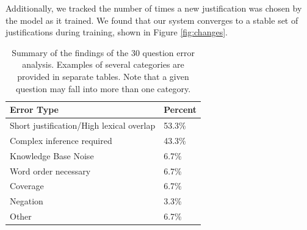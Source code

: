 Additionally, we tracked the number of times a new justification was chosen by the model as it trained. We found that our system converges to a stable set of justifications during training, shown in Figure \ref{fig:changes}.



\begin{table}[t]
\begin{center}
\begin{tabular}{ll}
\hline
Error Type & Percent \\ 
\hline
Short justification/High lexical overlap  & 53.3\%\\
Complex inference required   & 43.3\% \\
Knowledge Base Noise  & 6.7\% \\
Word order necessary	 & 6.7\% \\
Coverage & 6.7\% \\
Negation	& 3.3\% \\
Other & 6.7\% \\
\end{tabular}

\caption{{ Summary of the findings of the 30 question error analysis.  
Examples of several categories are provided in separate tables. 
Note that a given question may fall into more than one category.}} 
\label{tab:erroranalysis}
\vspace{-5mm}
\end{center}
\end{table}

